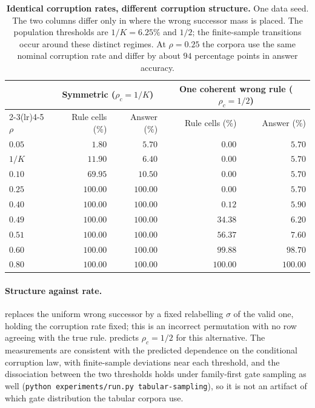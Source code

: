\begin{table}[t]
\centering
\small
\begin{tabular}{lrrrr}
\toprule
 & \multicolumn{2}{c}{Symmetric ($\rho_c=1/K$)} & \multicolumn{2}{c}{One coherent wrong rule ($\rho_c=1/2$)}\\
\cmidrule(lr){2-3}\cmidrule(lr){4-5}
$\rho$ & Rule cells (\%) & Answer (\%) & Rule cells (\%) & Answer (\%)\\
\midrule
$0.05$ & $1.80$   & $5.70$   & $0.00$   & $5.70$\\
$1/K$  & $11.90$  & $6.40$   & $0.00$   & $5.70$\\
$0.10$ & $69.95$  & $10.50$  & $0.00$   & $5.70$\\
$0.25$ & $100.00$ & $100.00$ & $0.00$   & $5.70$\\
$0.40$ & $100.00$ & $100.00$ & $0.12$   & $5.90$\\
$0.49$ & $100.00$ & $100.00$ & $34.38$  & $6.20$\\
$0.51$ & $100.00$ & $100.00$ & $56.37$  & $7.60$\\
$0.60$ & $100.00$ & $100.00$ & $99.88$  & $98.70$\\
$0.80$ & $100.00$ & $100.00$ & $100.00$ & $100.00$\\
\bottomrule
\end{tabular}
\caption{\textbf{Identical corruption rates, different corruption structure.}
One data seed.  The two columns differ only in where the wrong successor mass
is placed. The population thresholds are $1/K=6.25\%$ and $1/2$; the
finite-sample transitions occur around these distinct regimes. At $\rho=0.25$
the corpora use the same nominal corruption rate and differ by about $94$
percentage points in answer accuracy.}
\label{tab:noise-structure}
\end{table}

\paragraph{Structure against rate.}
 replaces the uniform wrong successor by a fixed
relabelling $\sigma$ of the valid one, holding the corruption rate fixed; this
is an incorrect permutation with no row agreeing with the true rule.
 predicts $\rho_c=1/2$ for this alternative.
The measurements are consistent with the predicted dependence on the
conditional corruption law, with finite-sample deviations near each
threshold, and the dissociation between the two thresholds holds under
family-first gate sampling as well (\texttt{python experiments/run.py
tabular-sampling}), so it is not an artifact of which gate distribution the
tabular corpora use.

